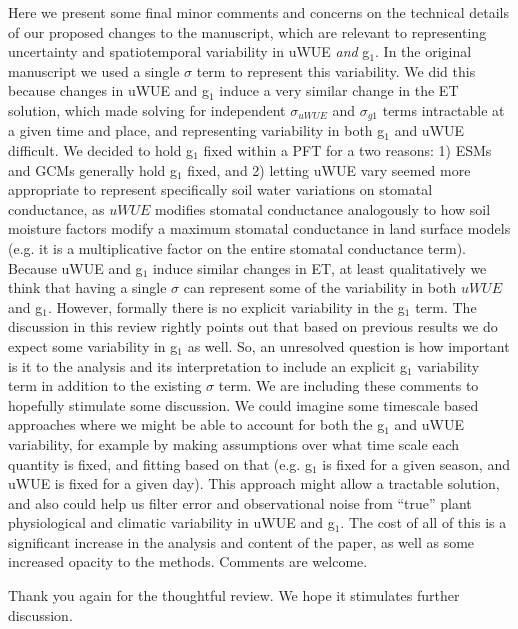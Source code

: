\documentclass[12pt]{article}
\begin{document}
Here we present some final minor comments and concerns on the
technical details of our proposed changes to the manuscript, which are
relevant to representing uncertainty and spatiotemporal variability in
uWUE \textit{and} g$_1$. In the original manuscript we used a single
$\sigma$ term to represent this variability. We did this because
changes in uWUE and g$_1$ induce a very similar change in the ET
solution, which made solving for independent $\sigma_{uWUE}$ and
$\sigma_{g1}$ terms intractable at a given time and place, and
representing variability in both g$_1$ and uWUE difficult. We decided
to hold g$_1$ fixed within a PFT for a two reasons: 1) ESMs and GCMs
generally hold g$_1$ fixed, and 2) letting uWUE vary seemed more
appropriate to represent specifically soil water variations on
stomatal conductance, as $uWUE$ modifies stomatal conductance
analogously to how soil moisture factors modify a maximum stomatal
conductance in land surface models (e.g. it is a multiplicative factor
on the entire stomatal conductance term). Because uWUE and g$_1$
induce similar changes in ET, at least qualitatively we think that
having a single $\sigma$ can represent some of the variability in both
$uWUE$ and g$_1$. However, formally there is no explicit variability
in the g$_1$ term. The discussion in this review rightly points out
that based on previous results we do expect some variability in g$_1$
as well. So, an unresolved question is how important is it to the
analysis and its interpretation to include an explicit g$_1$
variability term in addition to the existing $\sigma$ term. We are
including these comments to hopefully stimulate some discussion. We
could imagine some timescale based approaches where we might be able
to account for both the g$_1$ and uWUE variability, for example by
making assumptions over what time scale each quantity is fixed, and
fitting based on that (e.g. g$_1$ is fixed for a given season, and
uWUE is fixed for a given day). This approach might allow a tractable
solution, and also could help us filter error and observational noise
from ``true'' plant physiological and climatic variability in uWUE and
g$_1$. The cost of all of this is a significant increase in the
analysis and content of the paper, as well as some increased opacity
to the methods. Comments are welcome.

Thank you again for the thoughtful review. We hope it stimulates
further discussion.



\end{document}

